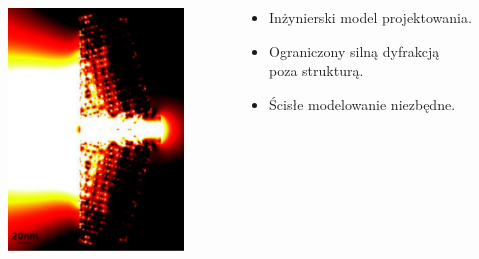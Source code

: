 \documentclass{beamer}
\begin{document}
\begin{frame}
\begin{columns}
\begin{column}{0.5\textwidth}
\begin{figure}
				\includegraphics[angle=90,width=\textwidth]{../images/multilayer/konc_ene_mgr.png}
			\end{figure}
		\end{column}
		\begin{column}{0.5\textwidth}
			\begin{itemize}
				\item Inżynierski model projektowania.
				\item Ograniczony silną dyfrakcją poza strukturą.
				\item Ścisłe modelowanie niezbędne.
			\end{itemize}
		
		\end{column}
	\end{columns}
		
\end{frame}
\end{document}
